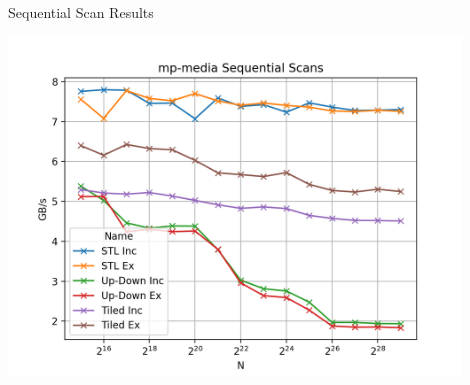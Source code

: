 \begin{frame}{Sequential Scan Results}
 
  \centering
  \vspace{-5pt}
  \includegraphics[width=0.90\textwidth]{"graphs/mp-media Sequential Scans"}
 
\end{frame}
